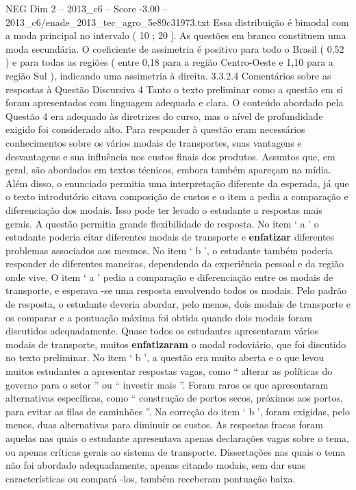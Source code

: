 \begin{textsample}{NEG Dim 2 – 2013\_c6 – Score -3.00 – 2013\_c6/enade\_2013\_tec\_agro\_5e89c31973.txt}
Essa distribuição é bimodal com a moda principal no intervalo ( 10 ; 20 ].
As questões em branco constituem uma moda secundária.
O coeficiente de assimetria é positivo para todo o Brasil ( 0,52 ) e para todas as regiões ( entre 0,18 para a região Centro-Oeste e 1,10 para a região Sul ), indicando uma assimetria à direita. 3.3.2.4 Comentários sobre as respostas à Questão Discursiva 4 Tanto o texto preliminar como a questão em si foram apresentados com linguagem adequada e clara.
O conteúdo abordado pela Questão 4 era adequado às diretrizes do curso, mas o nível de profundidade exigido foi considerado alto.
Para responder à questão eram necessários conhecimentos sobre os vários modais de transportes, suas vantagens e desvantagens e sua influência nos custos finais dos produtos.
Assuntos que, em geral, são abordados em textos técnicos, embora também apareçam na mídia.
Além disso, o enunciado permitia uma interpretação diferente da esperada, já que o texto introdutório citava composição de custos e o item a pedia a comparação e diferenciação dos modais.
Isso pode ter levado o estudante a respostas mais gerais.
A questão permitia grande flexibilidade de resposta.
No item ‘ a ’ o estudante poderia citar diferentes modais de transporte e \textbf{enfatizar} diferentes problemas associados aos mesmos.
No item ‘ b ’, o estudante também poderia responder de diferentes maneiras, dependendo da experiência pessoal e da região onde vive.
O item ‘ a ’ pedia a comparação e diferenciação entre os modais de transporte, e esperava -se uma resposta envolvendo todos os modais.
Pelo padrão de resposta, o estudante deveria abordar, pelo menos, dois modais de transporte e os comparar e a pontuação máxima foi obtida quando dois modais foram discutidos adequadamente.
Quase todos os estudantes apresentaram vários modais de transporte, muitos \textbf{enfatizaram} o modal rodoviário, que foi discutido no texto preliminar.
No item ‘ b ’, a questão era muito aberta e o que levou muitos estudantes a apresentar respostas vagas, como “ alterar as políticas do governo para o setor ” ou “ investir mais ”.
Foram raros os que apresentaram alternativas específicas, como “ construção de portos secos, próximos aos portos, para evitar as filas de caminhões ”.
Na correção do item ‘ b ’, foram exigidas, pelo menos, duas alternativas para diminuir os custos.
As respostas fracas foram aquelas nas quais o estudante apresentava apenas declarações vagas sobre o tema, ou apenas críticas gerais ao sistema de transporte.
Dissertações nas quais o tema não foi abordado adequadamente, apenas citando modais, sem dar suas características ou compará -los, também receberam pontuação baixa.

\end{textsample}
